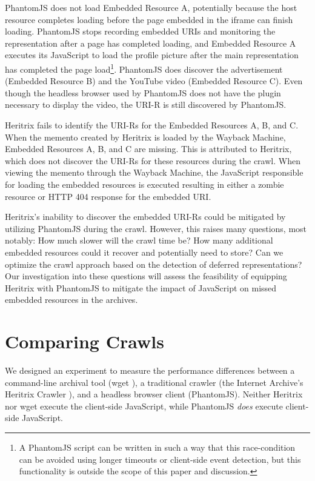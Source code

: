 \documentclass{ipres_proc_article-sp}
\begin{document}
PhantomJS does not load Embedded Resource A, potentially because the host resource completes loading before the page embedded in the iframe can finish loading. PhantomJS stops recording embedded URIs and monitoring the representation after a page has completed loading, and Embedded Resource A executes its JavaScript to load the profile picture after the main representation has completed the page load\footnote{A PhantomJS script can be written in such a way that this race-condition can be avoided using longer timeouts or client-side event detection, but this functionality is outside the scope of this paper and discussion.}. PhantomJS does discover the advertisement (Embedded Resource B) and the YouTube video (Embedded Resource C). Even though the headless browser used by PhantomJS does not have the plugin necessary to display the video, the URI-R is still discovered by PhantomJS.

Heritrix fails to identify the URI-Rs for the Embedded Resources A, B, and C. When the memento created by Heritrix is loaded by the Wayback Machine, Embedded Resources A, B, and C are missing. This is attributed to Heritrix, which does not discover the URI-Rs for these resources during the crawl. When viewing the memento through the Wayback Machine, the JavaScript responsible for loading the embedded resources is executed resulting in either a zombie resource \cite{zombies} or HTTP 404 response for the embedded URI.

Heritrix's inability to discover the embedded URI-Rs could be mitigated by utilizing PhantomJS during the crawl. However, this raises many questions, most notably: How much slower will the crawl time be? How many additional embedded resources could it recover and potentially need to store? Can we optimize the crawl approach based on the detection of deferred representations? Our investigation into these questions will assess the feasibility of equipping Heritrix with PhantomJS to mitigate the impact of JavaScript on missed embedded resources in the archives.


\vskip -3mm
\section{Comparing Crawls}
\label{performance}
We designed an experiment to measure the performance differences between a command-line archival tool (wget \cite{wget}), a traditional crawler (the Internet Archive's Heritrix Crawler \cite{heritrix, Sigurosson:Incremental-Heritrix}), and a headless browser client (PhantomJS). Neither Heritrix nor wget execute the client-side JavaScript, while PhantomJS \emph{does} execute client-side JavaScript.
\end{document}
